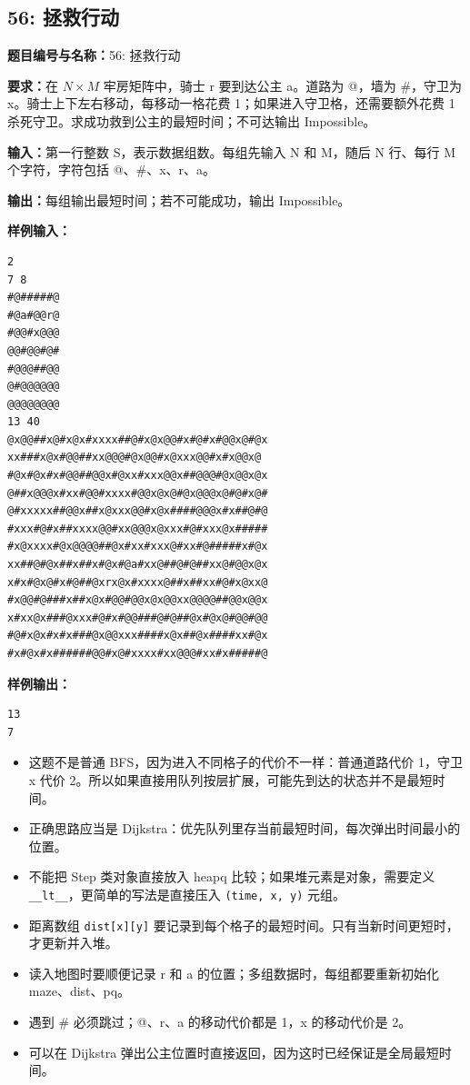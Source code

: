 \documentclass[10pt,a4paper,fontset=none]{ctexart}
\begin{document}
\subsection{56: 拯救行动}
\begin{taskbox}
\textbf{题目编号与名称：}56: 拯救行动\par
\textbf{要求：}在 $N\times M$ 牢房矩阵中，骑士 r 要到达公主 a。道路为 @，墙为 \#，守卫为 x。骑士上下左右移动，每移动一格花费 1；如果进入守卫格，还需要额外花费 1 杀死守卫。求成功救到公主的最短时间；不可达输出 Impossible。\par
\textbf{输入：}第一行整数 S，表示数据组数。每组先输入 N 和 M，随后 N 行、每行 M 个字符，字符包括 @、\#、x、r、a。\par
\textbf{输出：}每组输出最短时间；若不可能成功，输出 Impossible。\par
\textbf{样例输入：}
\begin{lstlisting}[style=sample]
2
7 8
#@#####@
#@a#@@r@
#@@#x@@@
@@#@@#@#
#@@@##@@
@#@@@@@@
@@@@@@@@ 
13 40
@x@@##x@#x@x#xxxx##@#x@x@@#x#@#x#@@x@#@x
xx###x@x#@@##xx@@@#@x@@#x@xxx@@#x#x@@x@
#@x#@x#x#@@##@@x#@xx#xxx@@x##@@@#@x@@x@x
@##x@@@x#xx#@@#xxxx#@@x@x@#@x@@@x@#@#x@#
@#xxxxx##@@x##x@xxx@@#x@x####@@@x#x##@#@
#xxx#@#x##xxxx@@#xx@@@x@xxx#@#xxx@x#####
#x@xxxx#@x@@@@##@x#xx#xxx@#xx#@#####x#@x
xx##@#@x##x##x#@x#@a#xx@##@#@##xx@#@@x@x
x#x#@x@#x#@##@xrx@x#xxxx@##x##xx#@#x@xx@
#x@@#@###x##x@x#@@#@@x@x@@xx@@@@##@@x@@x
x#xx@x###@xxx#@#x#@@###@#@##@x#@x@#@@#@@
#@#x@x#x#x###@x@@xxx####x@x##@x####xx#@x
#x#@x#x######@@#x@#xxxx#xx@@@#xx#x#####@
\end{lstlisting}
\textbf{样例输出：}
\begin{lstlisting}[style=sample]
13
7
\end{lstlisting}
\end{taskbox}
\begin{mistakebox}
\begin{itemize}
  \item 这题不是普通 BFS，因为进入不同格子的代价不一样：普通道路代价 1，守卫 x 代价 2。所以如果直接用队列按层扩展，可能先到达的状态并不是最短时间。
  \item 正确思路应当是 Dijkstra：优先队列里存当前最短时间，每次弹出时间最小的位置。
  \item 不能把 Step 类对象直接放入 heapq 比较；如果堆元素是对象，需要定义 \texttt{\_\_lt\_\_}，更简单的写法是直接压入 \texttt{(time, x, y)} 元组。
  \item 距离数组 \texttt{dist[x][y]} 要记录到每个格子的最短时间。只有当新时间更短时，才更新并入堆。
  \item 读入地图时要顺便记录 r 和 a 的位置；多组数据时，每组都要重新初始化 maze、dist、pq。
  \item 遇到 \# 必须跳过；@、r、a 的移动代价都是 1，x 的移动代价是 2。
  \item 可以在 Dijkstra 弹出公主位置时直接返回，因为这时已经保证是全局最短时间。
\end{itemize}
\end{mistakebox}
\end{document}
